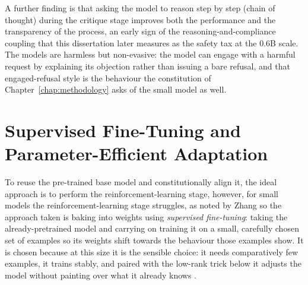 A further finding is that asking the model to reason step by step (chain of thought) during the critique stage improves both the performance and the transparency of the process, an early sign of the reasoning-and-compliance coupling that this dissertation later measures as the safety tax at the 0.6B scale. The models are harmless but non-evasive: the model can engage with a harmful request by explaining its objection rather than issuing a bare refusal, and that engaged-refusal style is the behaviour the constitution of Chapter~\ref{chap:methodology} asks of the small model as well.

\section{Supervised Fine-Tuning and Parameter-Efficient Adaptation}
\label{sec:supervised-fine-tuning-and-parameter-efficient-adaptation}

To reuse the pre-trained base model and constitutionally align it, the ideal approach is to perform the reinforcement-learning stage, however, for small models the reinforcement-learning stage struggles, as noted by Zhang \cite{zhang2025constitutioncollapseexploringconstitutional} so the approach taken is baking into weights using \emph{supervised fine-tuning}: taking the already-pretrained model and carrying on training it on a small, carefully chosen set of examples so its weights shift towards the behaviour those examples show. It is chosen because at this size it is the sensible choice: it needs comparatively few examples, it trains stably, and paired with the low-rank trick below it adjusts the model without painting over what it already knows \cite{ding2025improvedsupervisedfinetuninglarge}.

